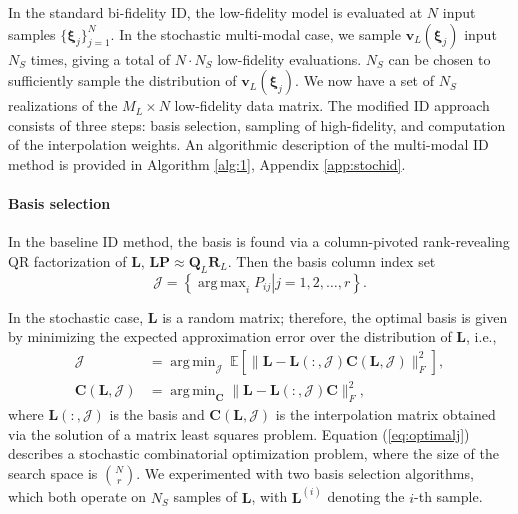 \documentclass[preprint,10pt]{elsarticle}
\DeclareMathOperator*{\argmax}{arg\,max}
\DeclareMathOperator*{\argmin}{arg\,min}
\begin{document}
In the standard bi-fidelity ID, the low-fidelity model is evaluated at $N$ input samples $\{ \boldsymbol \xi_j \}_{j=1}^N$. In the stochastic multi-modal case, we sample $\bm v_L(\bm\xi_j)$ input $N_S$ times, giving a total of $N \cdot N_S$ low-fidelity evaluations. $N_S$ can be chosen to sufficiently sample the distribution of $\boldsymbol v_L(\boldsymbol\xi_j)$. We now have a set of $N_S$ realizations of the $M_L \times N$ low-fidelity data matrix. The modified ID approach consists of three steps: basis selection, sampling of high-fidelity, and computation of the interpolation weights. An algorithmic description of the multi-modal ID method is provided in Algorithm \ref{alg:1}, Appendix \ref{app:stochid}.

\paragraph{Basis selection} 

In the baseline ID method, the basis is found via a column-pivoted rank-revealing QR factorization of $\bm L$, $\bm L \bm P \approx \bm Q_L \bm R_L$. Then the basis column index set
\begin{equation}
\label{eq:J}
    \mathcal{J} = \left\{ \left. \argmax_i P_{ij} \right \rvert j = 1, 2, \dots, r \right\}.
\end{equation}



In the stochastic case, $\bm L$ is a random matrix; therefore, the optimal basis is given by minimizing the expected approximation error over the distribution of $\bm L$, i.e.,
%
%
\begin{align}
\label{eq:optimalj}
    \mathcal{J} &= \argmin_{\mathcal{J}} \ \mathbb{E}\left[ \| \bm L - \bm L(:, \mathcal{J}) \bm C(\bm L, \mathcal{J}) \|_F^2 \right], \\ \bm C(\bm L, \mathcal{J}) &= \argmin_{\bm C} \| \bm L - \bm L(:, \mathcal{J}) \bm C \|_F^2, \label{eq:clstsq}
\end{align}
%
where $\bm L(:, \mathcal{J})$ is the basis and $\bm C(\bm L, \mathcal{J})$ is the interpolation matrix obtained via the solution of a matrix least squares problem. Equation (\ref{eq:optimalj}) describes a stochastic combinatorial optimization problem, where the size of the search space is $N \choose r$. We experimented with two basis selection algorithms, which both operate on $N_S$ samples of $\bm L$, with $\bm L^{(i)}$ denoting the $i$-th sample.
\end{document}
